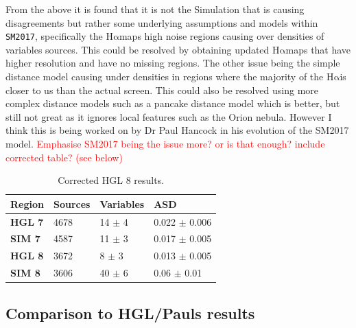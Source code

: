 \documentclass[a4paper]{article}
\def\halpha{$\mathrm{H\alpha}$\;}
\def\sm{\texttt{SM2017}}
\begin{document}
From the above it is found that it is not the Simulation that is causing disagreements but rather some underlying assumptions and models within \sm, specifically the \halpha maps high noise regions causing over densities of variables sources. This could be resolved by obtaining updated \halpha maps that have higher resolution and have no missing regions. The other issue being the simple distance model causing under densities in regions where the majority of the \halpha is closer to us than the actual screen. This could also be resolved using more complex distance models such as a pancake distance model which is better, but still not great as it ignores local features such as the Orion nebula. However I think this is being worked on by Dr Paul Hancock in his evolution of the SM2017 model.
\textcolor{red}{Emphasise SM2017 being the issue more? or is that enough? include corrected table? (see below)}
\begin{table}[H]
    \centering
\begin{tabular}{llll}
    \toprule
    \textbf{Region}	& \textbf{Sources}	&	\textbf{Variables}	&		\textbf{ASD}		\\ \midrule

    \textbf{HGL 7}	&	4678 &	14 $\pm$ 4	&	0.022 $\pm$ 0.006	\\
    \textbf{SIM 7}	&	4587 &	11 $\pm$ 3	&	0.017 $\pm$ 0.005	\\\midrule
    \textbf{HGL 8}	&	3672 &	8 $\pm$ 3 	&	0.013 $\pm$ 0.005	\\
    \textbf{SIM 8}	&   3606 &	40 $\pm$ 6	&	0.06 $\pm$ 0.01	\\\bottomrule
\end{tabular}
    \caption{Corrected HGL 8 results.}
    \label{tab:HGLcorr}
\end{table}
\subsection{Comparison to HGL/Pauls results}
\end{document}
